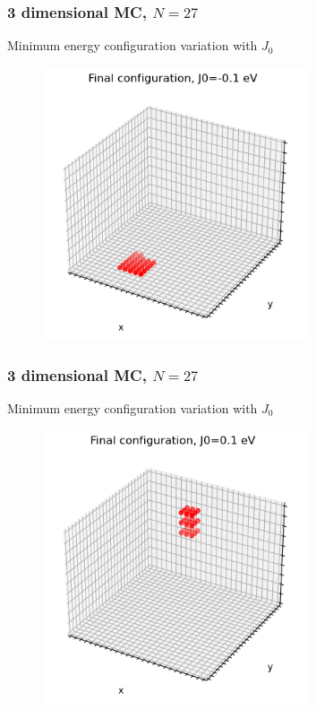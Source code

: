 \documentclass{beamer}
\begin{document}
\begin{frame}
    \frametitle{3 dimensional MC, $N=27$}

    \centering Minimum energy configuration variation with $J_0$

    \begin{figure}
        \includegraphics[width=0.7\textwidth]{images/dconf-0.1.png}
    \end{figure}

\end{frame}

\begin{frame}
    \frametitle{3 dimensional MC, $N=27$}

    \centering Minimum energy configuration variation with $J_0$

    \begin{figure}
        \includegraphics[width=0.7\textwidth]{images/dconf+0.1.png}
    \end{figure}

\end{frame}
\end{document}
